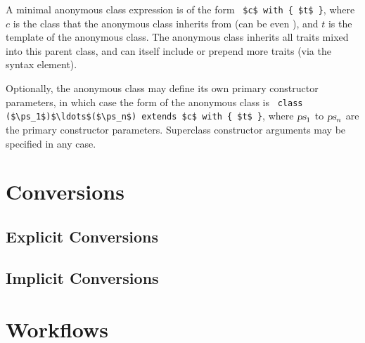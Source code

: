 A minimal anonymous class expression is of the form ~\lstinline!$c$ with { $t$ }!, where $c$ is the class that the anonymous class inherits from (can be even ), and $t$ is the template of the anonymous class. The anonymous class inherits all traits mixed into this parent class, and can itself include or prepend more traits (via the  syntax element). 

Optionally, the anonymous class may define its own primary constructor parameters, in which case the form of the anonymous class is ~\lstinline!class ($\ps_1$)$\ldots$($\ps_n$) extends $c$ with { $t$ }!, where $\mbox{\sl ps}_1$ to $\mbox{\sl ps}_n$ are the primary constructor parameters. Superclass constructor arguments may be specified in any case. 






\section{Conversions}

\subsection{Explicit Conversions}

\subsection{Implicit Conversions}
\label{sec:implicit-conversions}

\section{Workflows}
\label{sec:workflows}



